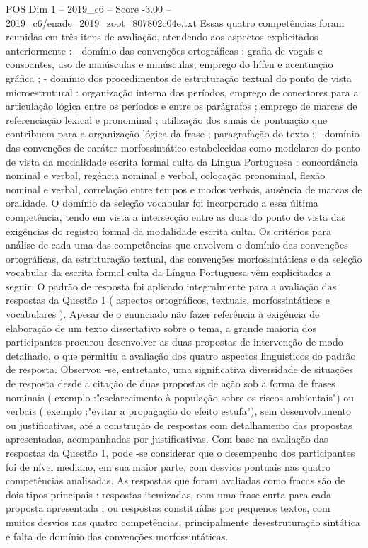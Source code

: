 \begin{textsample}{POS Dim 1 – 2019\_c6 – Score -3.00 – 2019\_c6/enade\_2019\_zoot\_807802c04e.txt}
Essas quatro competências foram reunidas em três itens de avaliação, atendendo aos aspectos explicitados anteriormente : - domínio das convenções ortográficas : grafia de vogais e consoantes, uso de maiúsculas e minúsculas, emprego do hífen e acentuação gráfica ; - domínio dos procedimentos de estruturação textual do ponto de vista microestrutural : organização interna dos períodos, emprego de conectores para a articulação lógica entre os períodos e entre os parágrafos ; emprego de marcas de referenciação lexical e pronominal ; utilização dos sinais de pontuação que contribuem para a organização lógica da frase ; paragrafação do texto ; - domínio das convenções de caráter morfossintático estabelecidas como modelares do ponto de vista da modalidade escrita formal culta da Língua Portuguesa : concordância nominal e verbal, regência nominal e verbal, colocação pronominal, flexão nominal e verbal, correlação entre tempos e modos verbais, ausência de marcas de oralidade.
O domínio da seleção vocabular foi incorporado a essa última competência, tendo em vista a intersecção entre as duas do ponto de vista das exigências do registro formal da modalidade escrita culta.
Os critérios para análise de cada uma das competências que envolvem o domínio das convenções ortográficas, da estruturação textual, das convenções morfossintáticas e da seleção vocabular da escrita formal culta da Língua Portuguesa vêm explicitados a seguir.
O padrão de resposta foi aplicado integralmente para a avaliação das respostas da Questão 1 ( aspectos ortográficos, textuais, morfossintáticos e vocabulares ).
Apesar de o enunciado não fazer referência à exigência de elaboração de um texto dissertativo sobre o tema, a grande maioria dos participantes procurou desenvolver as duas propostas de intervenção de modo detalhado, o que permitiu a avaliação dos quatro aspectos linguísticos do padrão de resposta.
Observou -se, entretanto, uma significativa diversidade de situações de resposta desde a citação de duas propostas de ação sob a forma de frases nominais ( exemplo :"esclarecimento à população sobre os riscos ambientais") ou verbais ( exemplo :"evitar a propagação do efeito estufa"), sem desenvolvimento ou justificativas, até a construção de respostas com detalhamento das propostas apresentadas, acompanhadas por justificativas.
Com base na avaliação das respostas da Questão 1, pode -se considerar que o desempenho dos participantes foi de nível mediano, em sua maior parte, com desvios pontuais nas quatro competências analisadas.
As respostas que foram avaliadas como fracas são de dois tipos principais : respostas itemizadas, com uma frase curta para cada proposta apresentada ; ou respostas constituídas por pequenos textos, com muitos desvios nas quatro competências, principalmente desestruturação sintática e falta de domínio das convenções morfossintáticas.

\end{textsample}
